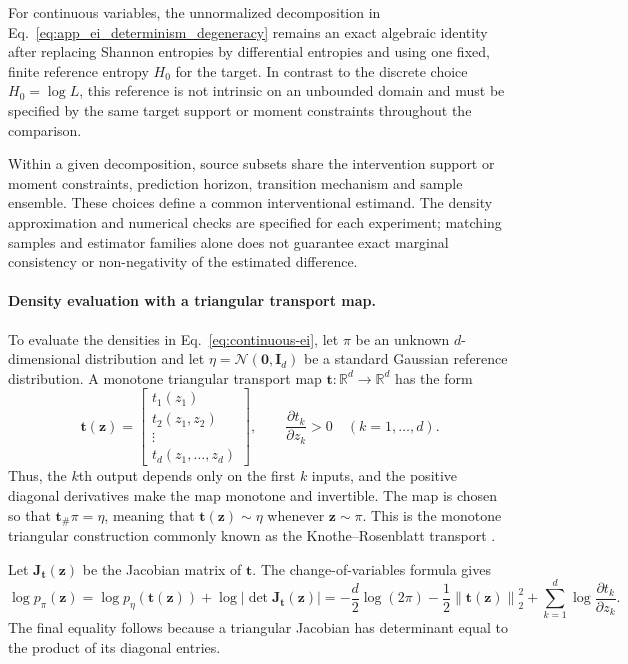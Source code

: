 For continuous variables, the unnormalized decomposition in
Eq.~\eqref{eq:app_ei_determinism_degeneracy} remains an exact algebraic
identity after replacing Shannon entropies by differential entropies and
using one fixed, finite reference entropy \(H_0\) for the target.  In
contrast to the discrete choice \(H_0=\log L\), this reference is not
intrinsic on an unbounded domain and must be specified by the same target
support or moment constraints throughout the comparison.

Within a given decomposition, source subsets share the intervention support or moment constraints, prediction horizon, transition mechanism and sample ensemble. These choices define a common interventional estimand. The density approximation and numerical checks are specified for each experiment; matching samples and estimator families alone does not guarantee exact marginal consistency or non-negativity of the estimated difference.

\paragraph{Density evaluation with a triangular transport map.}
To evaluate the densities in Eq.~\eqref{eq:continuous-ei}, let
\(\pi\) be an unknown \(d\)-dimensional distribution and let
\(\eta=\mathcal{N}(\boldsymbol{0},\mathbf{I}_d)\) be a standard Gaussian
reference distribution.  A monotone triangular transport map
\(\boldsymbol{t}:\mathbb{R}^{d}\to\mathbb{R}^{d}\) has the form
\begin{equation}
\boldsymbol{t}(\boldsymbol{z})
=
\begin{bmatrix}
t_1(z_1)\\
t_2(z_1,z_2)\\
\vdots\\
t_d(z_1,\ldots,z_d)
\end{bmatrix},
\qquad
\frac{\partial t_k}{\partial z_k}>0
\quad (k=1,\ldots,d).
\label{eq:transport-map-triangular}
\end{equation}
Thus, the \(k\)th output depends only on the first \(k\) inputs, and the
positive diagonal derivatives make the map monotone and invertible.  The map
is chosen so that
\(\boldsymbol{t}_{\#}\pi=\eta\), meaning that
\(\boldsymbol{t}(\boldsymbol{z})\sim\eta\) whenever
\(\boldsymbol{z}\sim\pi\).  This is the monotone triangular construction
commonly known as the Knothe--Rosenblatt transport
\cite{baptista2024representation}.

Let \(\mathbf{J}_{\boldsymbol{t}}(\boldsymbol{z})\) be the Jacobian matrix of
\(\boldsymbol{t}\).  The change-of-variables formula gives
\begin{equation}
\log p_{\pi}(\boldsymbol{z})
=
\log p_{\eta}\!\left(\boldsymbol{t}(\boldsymbol{z})\right)
+
\log
\left|
\det \mathbf{J}_{\boldsymbol{t}}(\boldsymbol{z})
\right|
=
-\frac{d}{2}\log(2\pi)
-\frac{1}{2}
\left\|
\boldsymbol{t}(\boldsymbol{z})
\right\|_2^2
+
\sum_{k=1}^{d}
\log
\frac{\partial t_k}{\partial z_k}.
\label{eq:transport-map-change-of-variables}
\end{equation}
The final equality follows because a triangular Jacobian has determinant
equal to the product of its diagonal entries.

